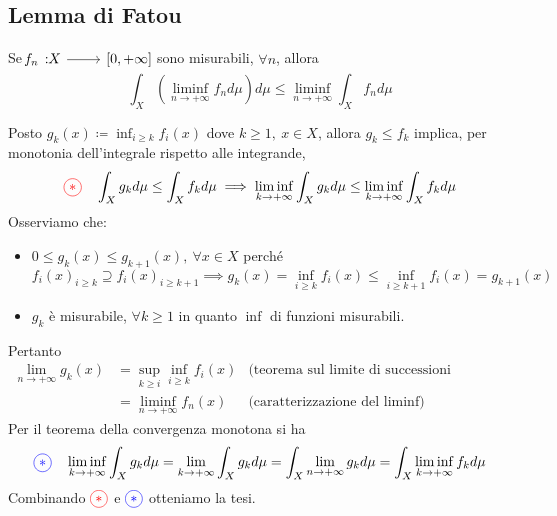\subsection{Lemma di Fatou}
\begin{lemming}
	Se $\funz{f_n}{X}{\left[0,+\infty\right]}$ sono misurabili, $\forall n$, allora
	\begin{equation}
		\int_X\left(\liminf_{n\to+\infty}f_nd\mu\right)d\mu\leq \liminf_{n\to+\infty}\int_Xf_nd\mu
	\end{equation}
\end{lemming}
\begin{demonstration}
	Posto $\displaystyle g_k\left(x\right)\coloneqq\inf_{i\geq k}f_i\left(x\right)$ dove $k\geq 1,\ x\in X$, allora $g_k\leq f_k$ implica, per monotonia dell'integrale rispetto alle integrande,
	\begin{equation*}
		\textcolor{red}{\circled{\ast}}\quad\int_Xg_kd\mu\leq \int_Xf_kd\mu\implies \liminf_{k\to+\infty}\int_Xg_kd\mu\leq \liminf_{k\to+\infty}\int_Xf_kd\mu
	\end{equation*}
Osserviamo che:
\begin{itemize}
	\item $0\leq g_k\left(x\right)\leq g_{k+1}\left(x\right),\ \forall x\in X$ perché
	\begin{equation*}
		f_i\left(x\right)_{i\geq k}\supseteq f_i\left(x\right)_{i\geq k+1}\implies g_k\left(x\right)=\inf_{i\geq k}f_i\left(x\right)\leq\inf_{i\geq k+1}f_i\left(x\right)=g_{k+1}\left(x\right)
	\end{equation*}
	\item $g_k$ è misurabile, $\forall k\geq 1$ in quanto $\inf$ di funzioni misurabili.
\end{itemize}
Pertanto
	\begin{align*}
	\lim_{n\to+\infty}g_k\left(x\right)&=\sup_{k\geq i}\inf_{i\geq k}f_i\left(x\right)&\text{(teorema sul limite di successioni monotone)}\\
	&=\liminf_{n\to+\infty}f_n\left(x\right)&\text{(caratterizzazione del $\liminf$)}
\end{align*}
Per il teorema della convergenza monotona si ha
\begin{equation*}
	\textcolor{blue}{\circled{\ast}}\quad \liminf_{k\to+\infty}\int_Xg_kd\mu=\lim_{k\to+\infty}\int_Xg_kd\mu=\int_X\lim_{n\to+\infty}g_kd\mu=\int_X\liminf_{k\to+\infty}f_kd\mu
\end{equation*}
Combinando $\textcolor{red}{\circled{\ast}}$ e $\textcolor{blue}{\circled{\ast}}$ otteniamo la tesi.
\end{demonstration}
